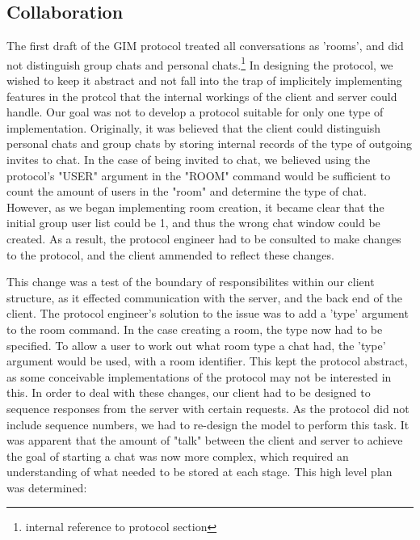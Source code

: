 \subsection{Collaboration}

The first draft of the GIM protocol treated all conversations as 'rooms', and did not distinguish group chats and personal chats.\footnote{internal reference to protocol section} In designing the protocol, we wished to keep it abstract and not fall into the trap of implicitely implementing features in the protcol that the internal workings of the client and server could handle. Our goal was not to develop a protocol suitable for only one type of implementation. Originally, it was believed that the client could distinguish personal chats and group chats by storing internal records of the type of outgoing invites to chat. In the case of being invited to chat, we believed using the protocol's "USER" argument in the "ROOM" command would be sufficient to count the amount of users in the "room" and determine the type of chat. However, as we began implementing room creation, it became clear that the initial group user list could be 1, and thus the wrong chat window could be created. As a result, the protocol engineer had to be consulted to make changes to the protocol, and the client ammended to reflect these changes. 

This change was a test of the boundary of responsibilites within our client structure, as it effected communication with the server, and the back end of the client. The protocol engineer's solution to the issue was to add a 'type' argument to the room command. In the case creating a room, the type now had to be specified. To allow a user to work out what room type a chat had, the 'type' argument would be used, with a room identifier. This kept the protocol abstract, as some conceivable implementations of the protocol may not be interested in this. In order to deal with these changes, our client had to be designed to sequence responses from the server with certain requests. As the protocol did not include sequence numbers, we had to re-design the model to perform this task. It was apparent that the amount of "talk" between the client and server to achieve the goal of starting a chat was now more complex, which required an understanding of what needed to be stored at each stage. This high level plan was determined:

